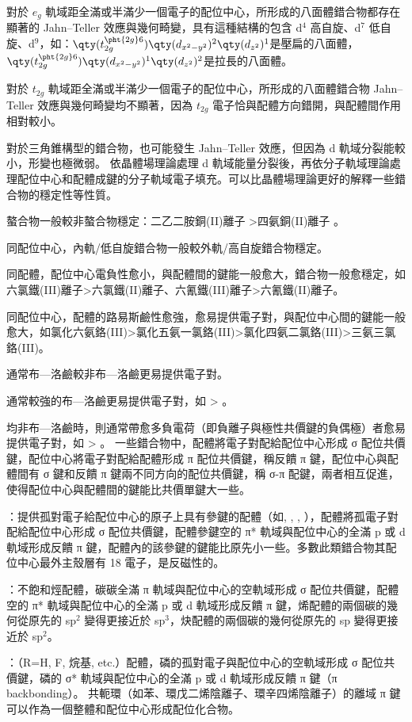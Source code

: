 \documentclass[a4paper,12pt]{report}
\begin{document}
對於 $e_g$ 軌域距全滿或半滿少一個電子的配位中心，所形成的八面體錯合物都存在顯著的 Jahn–Teller 效應與幾何畸變，具有這種結構的包含 d$^4$ 高自旋、d$^7$ 低自旋、d$^9$，如：$\qty(t_{2g}^{\pht{2g}6})\qty(d_{x^2-y^2})^2\qty(d_{z^2})^1$是壓扁的八面體，$\qty(t_{2g}^{\pht{2g}6})\qty(d_{x^2-y^2})^1\qty(d_{z^2})^2$是拉長的八面體。

對於 $t_{2g}$ 軌域距全滿或半滿少一個電子的配位中心，所形成的八面體錯合物 Jahn–Teller 效應與幾何畸變均不顯著，因為 $t_{2g}$ 電子恰與配體方向錯開，與配體間作用相對較小。

對於三角錐構型的錯合物，也可能發生 Jahn–Teller 效應，但因為 d 軌域分裂能較小，形變也極微弱。
依晶體場理論處理 d 軌域能量分裂後，再依分子軌域理論處理配位中心和配體成鍵的分子軌域電子填充。可以比晶體場理論更好的解釋一些錯合物的穩定性等性質。
\ben
\item 螯合物一般較非螯合物穩定：二乙二胺銅(II)離子 >四氨銅(II)離子 。
\item 同配位中心，內軌/低自旋錯合物一般較外軌/高自旋錯合物穩定。
\item 同配體，配位中心電負性愈小，與配體間的鍵能一般愈大，錯合物一般愈穩定，如六氯鐵(III)離子>六氯鐵(II)離子、六氰鐵(III)離子>六氰鐵(II)離子。
\item 同配位中心，配體的路易斯鹼性愈強，愈易提供電子對，與配位中心間的鍵能一般愈大，如氯化六氨鉻(III)>氯化五氨一氯鉻(III)>氯化四氨二氯鉻(III)>三氨三氯鉻(III)\ce{[Cr(NH3)3Cl3]}。
\ben
\item 通常布—洛鹼較非布—洛鹼更易提供電子對。
\item 通常較強的布—洛鹼更易提供電子對，如 > 。
\item 均非布—洛鹼時，則通常帶愈多負電荷（即負離子與極性共價鍵的負偶極）者愈易提供電子對，如 > 。
\een
\een
{}
一些錯合物中，配體將電子對配給配位中心形成 σ 配位共價鍵，配位中心將電子對配給配體形成 π 配位共價鍵，稱反饋 π 鍵，配位中心與配體間有 σ 鍵和反饋 π 鍵兩不同方向的配位共價鍵，稱 σ-π 配鍵，兩者相互促進，使得配位中心與配體間的鍵能比共價單鍵大一些。
\bit
\item {}：提供孤對電子給配位中心的原子上具有參鍵的配體（如, , , ），配體將孤電子對配給配位中心形成 σ 配位共價鍵，配體參鍵空的 π* 軌域與配位中心的全滿 p 或 d 軌域形成反饋 π 鍵，配體內的該參鍵的鍵能比原先小一些。多數此類錯合物其配位中心最外主殼層有 18 電子，是反磁性的。
\item {}：不飽和烴配體，碳碳全滿 π 軌域與配位中心的空軌域形成 σ 配位共價鍵，配體空的 π* 軌域與配位中心的全滿 p 或 d 軌域形成反饋 π 鍵，烯配體的兩個碳的幾何從原先的 sp$^2$ 變得更接近於 sp$^3$，炔配體的兩個碳的幾何從原先的 sp 變得更接近於 sp$^2$。
\item {}：（R=H, F, 烷基, etc.）配體，磷的孤對電子與配位中心的空軌域形成 σ 配位共價鍵，磷的 σ* 軌域與配位中心的全滿 p 或 d 軌域形成反饋 π 鍵（π backbonding）。
\eit
{}
共軛環（如苯、環戊二烯陰離子、環辛四烯陰離子）的離域 π 鍵可以作為一個整體和配位中心形成配位化合物。
\end{document}
